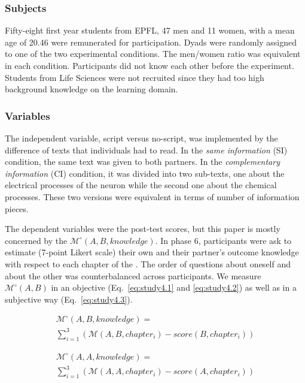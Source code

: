 \documentclass[twocolumn]{article}
\newcommand{\M}[3]{{\mathcal{M}(#1, #2, #3)}}
\newcommand{\Model}[3]{{$\mathcal{M}^{\circ}(#1, #2, #3)$}}
\newcommand{\gModel}[2]{{$\mathcal{M}^{\circ}(#1, #2)$}}
\newcommand{\Mdeg}[3]{{\mathcal{M}^{\circ}(#1, #2, #3)}}
\begin{document}
\subsubsection*{Subjects}

Fifty-eight first year students from EPFL, 47 men and 11 women, with a mean age
of 20.46 were remunerated for participation. Dyads were randomly assigned to one
of the two experimental conditions. The men/women ratio was equivalent in each
condition. Participants did not know each other before the experiment. Students
from Life Sciences were not recruited since they had too high background
knowledge on the learning domain.

\subsubsection*{Variables}

The independent variable, script versus no-script, was implemented by the
difference of texts that individuals had to read. In the \emph{same information}
(SI) condition, the same text was given to both partners. In the
\emph{complementary information} (CI) condition, it was divided into two
sub-texts, one about the electrical processes of the neuron while the second one
about the chemical processes. These two versions were equivalent in terms of
number of information pieces. 

The dependent variables were the post-test scores, but this paper is mostly
concerned by the \Model{A}{B}{knowledge}. In phase 6, participants were ask to
estimate (7-point Likert scale) their own and their partner's outcome knowledge
with respect to each chapter of the . The order of questions about
oneself and about the other was counterbalanced across participants. We measure
\gModel{A}{B} in an objective (Eq.~\ref{eq:study4.1} and \ref{eq:study4.2}) as
well as in a subjective way (Eq.~\ref{eq:study4.3}).

\begin{multline} \label{eq:study4.1}
    \Mdeg{A}{B}{knowledge} = \\
        \sum_{i=1}^{3} (\M{A}{B}{chapter_i} - score(B, chapter_i))
\end{multline}

\begin{multline} \label{eq:study4.2}
    \Mdeg{A}{A}{knowledge} = \\
        \sum_{i=1}^{3}  (\M{A}{A}{chapter_i} - score(A, chapter_i))
\end{multline}
\end{document}
